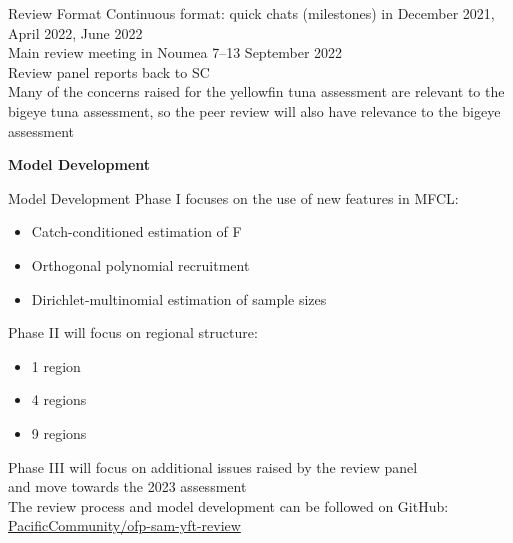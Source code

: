 \documentclass[aspectratio=169]{beamer}
\begin{document}

\begin{frame}{Review Format}\small
  Continuous format: quick chats (milestones) in December 2021, April 2022, June
  2022\\[5ex]
  Main review meeting in Noumea 7--13 September 2022\\[5ex]
  Review panel reports back to SC\\[5ex]
  Many of the concerns raised for the yellowfin tuna assessment are relevant to
  the bigeye tuna assessment, so the peer review will also have relevance to the
  bigeye assessment\\[5ex]
\end{frame}


\begin{frame}\Large
  \centering\darkgreen\bf
  Model Development
\end{frame}


\begin{frame}{Model Development}\fns
  {\darkgreen Phase I} focuses on the use of new features in MFCL:
  \begin{itemize}
    \item Catch-conditioned estimation of F\\[-1ex]
    \item Orthogonal polynomial recruitment\\[-1ex]
    \item Dirichlet-multinomial estimation of sample sizes\\[-1ex]
  \end{itemize}
  \vspace{3ex}
  {\darkgreen Phase II} will focus on regional structure:
  \begin{itemize}
    \item 1 region\\[-1ex]
    \item 4 regions\\[-1ex]
    \item 9 regions\\[-1ex]
  \end{itemize}
  \vspace{3ex}
  {\darkgreen Phase III} will focus on additional issues raised by the review
  panel\\
  and move towards the 2023 assessment\\
  \vspace{3ex}
  The review process and model development can be followed on GitHub:\\
  \qquad\href{https://github.com/PacificCommunity/ofp-sam-yft-review}%
  {\blue PacificCommunity/ofp-sam-yft-review}
  \vspace{3ex}
\end{frame}
\end{document}
